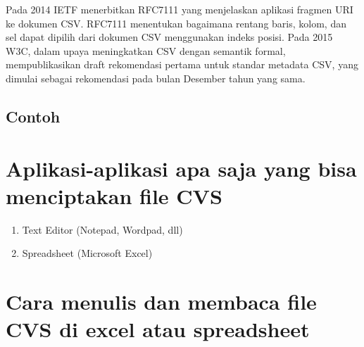 \documentclass[12pt, times new roman]{report}
\begin{document}
Pada 2014 IETF menerbitkan RFC7111 yang menjelaskan aplikasi fragmen URI ke dokumen CSV. RFC7111 menentukan bagaimana rentang
baris, kolom, dan sel dapat dipilih dari dokumen CSV menggunakan indeks posisi. Pada 2015 W3C, dalam upaya meningkatkan CSV dengan
semantik formal, mempublikasikan draft rekomendasi pertama untuk standar metadata CSV, yang dimulai sebagai rekomendasi pada bulan Desember tahun yang sama.

\subsection{Contoh}



\section{Aplikasi-aplikasi apa saja yang bisa menciptakan file CVS}
\begin{enumerate}
    \item Text Editor (Notepad, Wordpad, dll)
    \item Spreadsheet (Microsoft Excel)
\end{enumerate}

\section{Cara menulis dan membaca file CVS di excel atau spreadsheet}
\end{document}
